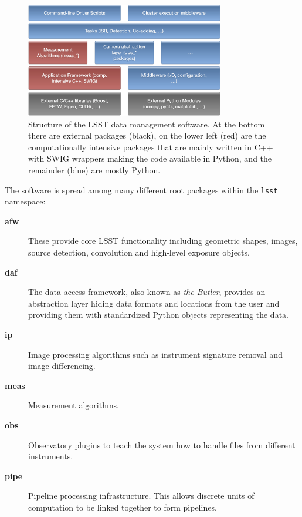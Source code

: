 \documentclass[]{spie}  %
\begin{document}
\begin{figure} [t]
\begin{center}
\includegraphics[height=5cm]{Software-Layers}
\end{center}
\caption[layers]
{\label{fig:layers}
Structure of the LSST data management software.
At the bottom there are external packages (black), on the lower left (red) are the computationally intensive packages that are mainly written in C++ with SWIG wrappers making the code available in Python, and the remainder (blue) are mostly Python.}
\end{figure}

The software is spread among many different root packages within the \texttt{lsst} namespace:

\begin{description}
\item[\textbf{afw}] These provide core LSST functionality including geometric shapes, images, source detection, convolution and high-level exposure objects.

\item[\textbf{daf}] The data access framework, also known as \emph{the Butler}, provides an abstraction layer hiding data formats and locations from the user and providing them with standardized Python objects representing the data.

\item[\textbf{ip}] Image processing algorithms such as instrument signature removal and image differencing.

\item[\textbf{meas}] Measurement algorithms.

\item[\textbf{obs}] Observatory plugins to teach the system how to handle files from different instruments.

\item[\textbf{pipe}] Pipeline processing infrastructure. This allows discrete units of computation to be linked together to form pipelines.

\end{description}
\end{document}

